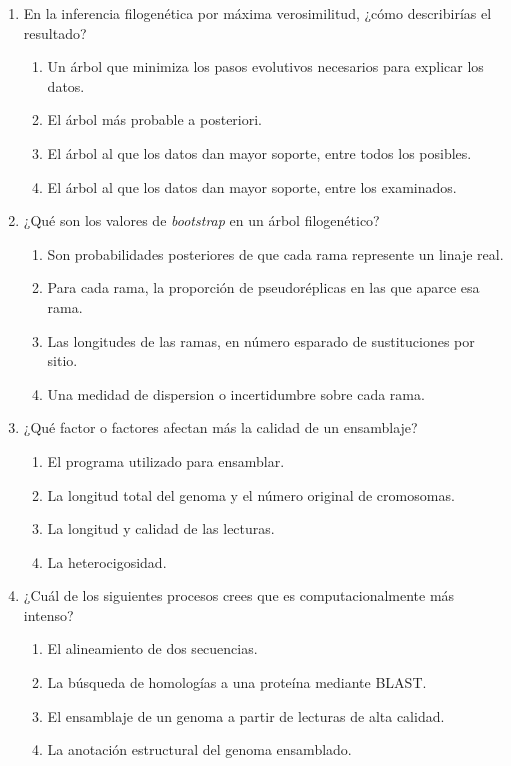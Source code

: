 \documentclass[a4paper,12pt]{article}
\begin{document}
\begin{enumerate}
\item En la inferencia filogenética por máxima verosimilitud, ¿cómo describirías el resultado?
   \begin{enumerate}
   \item Un árbol que minimiza los pasos evolutivos necesarios para explicar los datos.
   \item El árbol más probable a posteriori.
   \item El árbol al que los datos dan mayor soporte, entre todos los posibles.
   \item El árbol al que los datos dan mayor soporte, entre los examinados.
   \end{enumerate}

\item ¿Qué son los valores de \emph{bootstrap} en un árbol filogenético?
   \begin{enumerate}
   \item Son probabilidades posteriores de que cada rama represente un linaje real.
   \item Para cada rama, la proporción de pseudoréplicas en las que aparce esa rama.
   \item Las longitudes de  las ramas, en número esparado de sustituciones por sitio.
   \item Una medidad de dispersion o incertidumbre sobre cada rama.
   \end{enumerate}

\item ¿Qué factor o factores afectan más la calidad de un ensamblaje?
   \begin{enumerate}
   \item El programa utilizado para ensamblar.
   \item La longitud total del genoma y el número original de cromosomas.
   \item La longitud y calidad de las lecturas.
   \item La heterocigosidad.
   \end{enumerate}

\item ¿Cuál de los siguientes procesos crees que es computacionalmente más intenso?
   \begin{enumerate}
   \item El alineamiento de dos secuencias.
   \item La búsqueda de homologías a una proteína mediante BLAST.
   \item El ensamblaje de un genoma a partir de lecturas de alta calidad.
   \item La anotación estructural del genoma ensamblado.
   \end{enumerate}


\end{enumerate}
\end{document}
